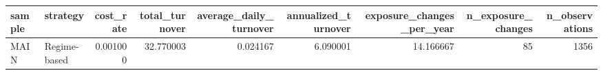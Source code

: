 \begin{tabular}{llrrrrrrr}
\toprule
sample & strategy & cost_rate & total_turnover & average_daily_turnover & annualized_turnover & exposure_changes_per_year & n_exposure_changes & n_observations \\
\midrule
MAIN & Regime-based & 0.001000 & 32.770003 & 0.024167 & 6.090001 & 14.166667 & 85 & 1356 \\
\bottomrule
\end{tabular}
